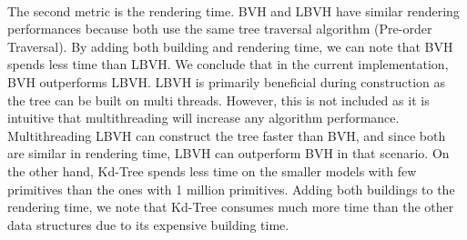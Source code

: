 \documentclass[11pt,a4paper]{article}
\begin{document}
\noindent
\\
The second metric is the rendering time. BVH and LBVH have similar rendering performances because both use the same tree traversal algorithm (Pre-order Traversal). By adding both building and rendering time, we can note that BVH spends less time than LBVH. We conclude that in the current implementation, BVH outperforms LBVH. LBVH is primarily beneficial during construction as the tree can be built on multi threads. However, this is not included as it is intuitive that multithreading will increase any algorithm performance. Multithreading LBVH can construct the tree faster than BVH, and since both are similar in rendering time, LBVH can outperform BVH in that scenario. On the other hand, Kd-Tree spends less time on the smaller models with few primitives than the ones with 1 million primitives. Adding both buildings to the rendering time, we note that Kd-Tree consumes much more time than the other data structures due to its expensive building time. 
\end{document}
